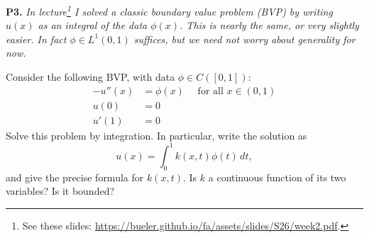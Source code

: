 \documentclass[12pt]{amsart}
\newcommand{\prob}[1]{\bigskip\noindent\textbf{#1.}\quad }
\begin{document}
\prob{P3}  \emph{In lecture\footnote{See these slides: \url{https://bueler.github.io/fa/assets/slides/S26/week2.pdf}.} I solved a classic boundary value problem (BVP) by writing $u(x)$ as an integral of the data $\phi(x)$.  This is nearly the same, or very slightly easier.  In fact $\phi \in L^1(0,1)$ suffices, but we need not worry about generality for now.}

\medskip \noindent Consider the following BVP, with data $\phi\in C([0,1])$:
\begin{align*}
-u''(x) &= \phi(x) \quad \text{ for all } x\in (0,1) \\
u(0) &= 0 \\
u'(1) &= 0
\end{align*}
Solve this problem by integration.  In particular, write the solution as
	$$u(x) = \int_0^1 k(x,t) \phi(t)\,dt,$$
and give the precise formula for $k(x,t)$.  Is $k$ a continuous function of its two variables?  Is it bounded?
\end{document}

